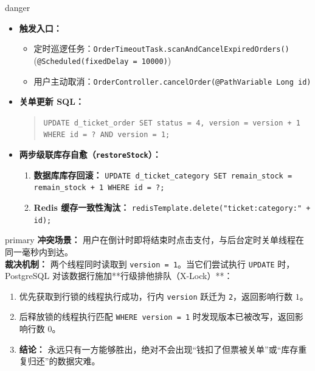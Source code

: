 \documentclass[a4paper,11pt]{ctexart}
\begin{document}
\begin{detailcard}{danger}
\begin{itemize}[leftmargin=0.8cm, itemsep=3pt]
    \item \textbf{触发入口：}
    \begin{itemize}
        \item 定时巡逻任务：\texttt{OrderTimeoutTask.scanAndCancelExpiredOrders()} (\texttt{@Scheduled(fixedDelay = 10000)})
        \item 用户主动取消：\texttt{OrderController.cancelOrder(@PathVariable Long id)}
    \end{itemize}
    \item \textbf{关单更新 SQL：}
    \begin{quote}
        \footnotesize
        \texttt{UPDATE d\_ticket\_order SET status = 4, version = version + 1 WHERE id = ? AND version = 1;}
    \end{quote}
    \item \textbf{两步级联库存自愈（\texttt{restoreStock}）：}
    \begin{enumerate}
        \item \textbf{数据库库存回滚：} \texttt{UPDATE d\_ticket\_category SET remain\_stock = remain\_stock + 1 WHERE id = ?;}
        \item \textbf{Redis 缓存一致性淘汰：} \texttt{redisTemplate.delete("ticket:category:" + id);}
    \end{enumerate}
\end{itemize}
\end{detailcard}

\vspace{0.2cm}

\begin{detailcard}{primary}
\small
\textbf{冲突场景：} 用户在倒计时即将结束时点击支付，与后台定时关单线程在同一毫秒内到达。\\
\textbf{裁决机制：}
两个线程同时读取到 \texttt{version = 1}。当它们尝试执行 \texttt{UPDATE} 时，PostgreSQL 对该数据行施加**行级排他排队（X-Lock）**：
\begin{enumerate}[leftmargin=0.8cm, itemsep=2pt]
    \item 优先获取到行锁的线程执行成功，行内 \texttt{version} 跃迁为 \texttt{2}，返回影响行数 $1$。
    \item 后释放锁的线程执行匹配 \texttt{WHERE version = 1} 时发现版本已被改写，返回影响行数 $0$。
    \item \textbf{结论：} 永远只有一方能够胜出，绝对不会出现“钱扣了但票被关单”或“库存重复归还”的数据灾难。
\end{enumerate}
\end{detailcard}
\end{document}
